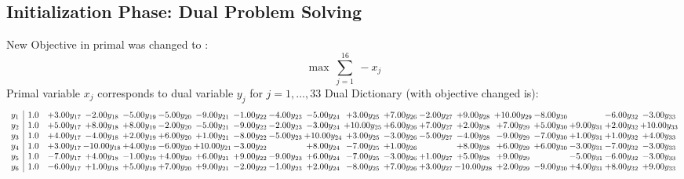 \documentclass[9pt]{article}
\begin{document}
\subsection{Initialization Phase: Dual Problem Solving}
New Objective in primal was changed to : \[ \max\ \sum_{j=1}^{16}\ - x_j \] 
Primal variable $x_j$ corresponds to dual variable $y_j$ for $j = 1,\ldots,33$
Dual Dictionary (with objective changed is): 
\[\begin{array}{c| c c@{\hskip 2pt} c@{\hskip 2pt} c@{\hskip 2pt} c@{\hskip 2pt} c@{\hskip 2pt} c@{\hskip 2pt} c@{\hskip 2pt} c@{\hskip 2pt} c@{\hskip 2pt} c@{\hskip 2pt} c@{\hskip 2pt} c@{\hskip 2pt} c@{\hskip 2pt} c@{\hskip 2pt} c@{\hskip 2pt} c@{\hskip 2pt} c@{\hskip 2pt} }
 y_{1}   &  1.0 & +  3.00 y_{17} & -2.00 y_{18} & -5.00 y_{19} & -5.00 y_{20} & -9.00 y_{21} & -1.00 y_{22} & -4.00 y_{23} & -5.00 y_{24} & +  3.00 y_{25} & +  7.00 y_{26} & -2.00 y_{27} & +  9.00 y_{28} & + 10.00 y_{29} & -8.00 y_{30} &   & -6.00 y_{32} & -3.00 y_{33}\\
 y_{2}   &  1.0 & +  5.00 y_{17} & +  8.00 y_{18} & +  8.00 y_{19} & -2.00 y_{20} & -5.00 y_{21} & -9.00 y_{22} & -2.00 y_{23} & -3.00 y_{24} & + 10.00 y_{25} & +  6.00 y_{26} & +  7.00 y_{27} & +  2.00 y_{28} & +  7.00 y_{29} & +  5.00 y_{30} & +  9.00 y_{31} & +  2.00 y_{32} & + 10.00 y_{33}\\
 y_{3}   &  1.0 & +  4.00 y_{17} & -4.00 y_{18} & +  2.00 y_{19} & +  6.00 y_{20} & +  1.00 y_{21} & -8.00 y_{22} & -5.00 y_{23} & + 10.00 y_{24} & +  3.00 y_{25} & -3.00 y_{26} & -5.00 y_{27} & -4.00 y_{28} & -9.00 y_{29} & -7.00 y_{30} & +  1.00 y_{31} & +  1.00 y_{32} & +  4.00 y_{33}\\
 y_{4}   &  1.0 & +  3.00 y_{17} & -10.00 y_{18} & +  4.00 y_{19} & -6.00 y_{20} & + 10.00 y_{21} & -3.00 y_{22} &   & +  8.00 y_{24} & -7.00 y_{25} & +  1.00 y_{26} &   & +  8.00 y_{28} & +  6.00 y_{29} & +  6.00 y_{30} & -3.00 y_{31} & -7.00 y_{32} & -3.00 y_{33}\\
 y_{5}   &  1.0 & -7.00 y_{17} & +  4.00 y_{18} & -1.00 y_{19} & +  4.00 y_{20} & +  6.00 y_{21} & +  9.00 y_{22} & -9.00 y_{23} & +  6.00 y_{24} & -7.00 y_{25} & -3.00 y_{26} & +  1.00 y_{27} & +  5.00 y_{28} & +  9.00 y_{29} &   & -5.00 y_{31} & -6.00 y_{32} & -3.00 y_{33}\\
 y_{6}   &  1.0 & -6.00 y_{17} & +  1.00 y_{18} & +  5.00 y_{19} & +  7.00 y_{20} & +  9.00 y_{21} & -2.00 y_{22} & -1.00 y_{23} & +  2.00 y_{24} & -8.00 y_{25} & +  7.00 y_{26} & +  3.00 y_{27} & -10.00 y_{28} & +  2.00 y_{29} & -9.00 y_{30} & +  4.00 y_{31} & +  8.00 y_{32} & +  9.00 y_{33}\\

\end{array}\]
\end{document}

